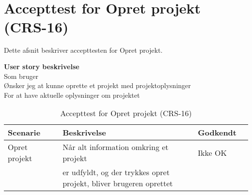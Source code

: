 \section{Accepttest for Opret projekt (CRS-16)}
Dette afsnit beskriver accepttesten for Opret projekt.

\textbf{User story beskrivelse} \\
Som bruger \\
Ønsker jeg at kunne oprette et projekt med projektoplysninger \\
For at have aktuelle oplysninger om projektet

\begin{table}[H]
	\centering
	\begin{tabular}{|ll|l|ll|} \hline
		\textbf{Scenarie} &  & \textbf{Beskrivelse}&  \textbf{Godkendt}&  \\ \hline
		Opret projekt&  &  Når alt information omkring et projekt &  Ikke OK&  \\
		& & er udfyldt, og der trykkes opret projekt, bliver brugeren oprettet& & \\ \hline
	\end{tabular}
	\caption{Accepttest for Opret projekt (CRS-16)}
	\label{AcceptOpretProjekt}
\end{table}